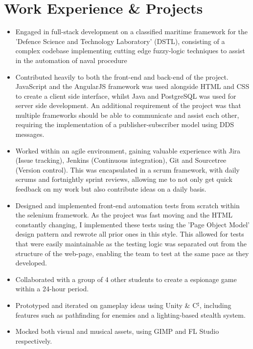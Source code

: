 \documentclass{cvclass}
\begin{document}
\section{Work Experience \& Projects}
\newline
\begin{itemize}
\item{Engaged in full-stack development on a classified maritime framework for the 'Defence Science and Technology Laboratory' (DSTL), consisting of a complex codebase implementing cutting edge fuzzy-logic techniques to assist in the automation of naval procedure}
\item{Contributed heavily to both the front-end and back-end of the project. JavaScript and the AngularJS framework was used alongside HTML and CSS to create a client side interface,
whilst Java and PostgreSQL was used for server side development. An additional requirement of the project was that multiple frameworks should be able to communicate and assist each other, requiring the implementation of a publisher-subscriber model using DDS messages.}
\item{Worked within an agile environment, gaining valuable experience with Jira (Issue tracking), Jenkins (Continuous integration), Git and Sourcetree (Version control). This was encapsulated in a scrum framework, with daily scrums and fortnightly sprint reviews, allowing me to not only get quick feedback on my work but also contribute ideas on a daily basis.}
\item{Designed and implemented front-end automation tests from scratch within the selenium framework. As the project was fast moving and the HTML constantly changing, I implemented these tests using the 'Page Object Model' design pattern and rewrote all prior ones in this style. This allowed for tests that were easily maintainable as the testing logic was separated out from the structure of the web-page, enabling the team to test at the same pace as they developed.}
\end{itemize}

\newline
\begin{itemize}
\item{Collaborated with a group of 4 other students to create a espionage game within a 24-hour period.}
\item{Prototyped and iterated on gameplay ideas using Unity \& C$^\sharp$, including features such as pathfinding for enemies and a lighting-based stealth system.}
\item{Mocked both visual and musical assets, using GIMP and FL Studio respectively.}
\end{itemize}
\end{document}
